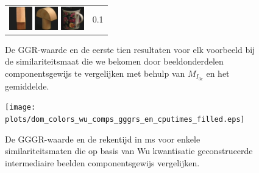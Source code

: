 {\begin{figure}[p]
\begin{tabular}{m{11cm} | m{3cm} |}
\includegraphics[width=1cm]{coil/beeld-44.eps}
\includegraphics[width=1cm]{coil/beeld-4.eps}
\includegraphics[width=1cm]{coil/beeld-64.eps}
& {\scriptsize 0.1}
\\
\end{tabular}
\vspace{5pt}
\caption{\label{fig:results_beste_multires_pixelgeb}De GGR-waarde en de eerste tien resultaten 
voor elk voorbeeld bij de similariteitsmaat die we bekomen door 
beeldonderdelen componentsgewijs te vergelijken met behulp van $M_{I_{3c}}$ en het gemiddelde.}
\end{figure}

\begin{figure}[p]
\centering
\texttt{[image: plots/dom\_colors\_wu\_comps\_gggrs\_en\_cputimes\_filled.eps]}
\vspace{1pt}
\caption{\label{fig:dom_colors_wu_comps_gggrs_en_cputimes}De GGGR-waarde en de rekentijd in ms 
voor enkele similariteitsmaten die
op basis van Wu kwantisatie geconstrueerde intermediaire beelden componentsgewijs vergelijken.}
\end{figure}

}
